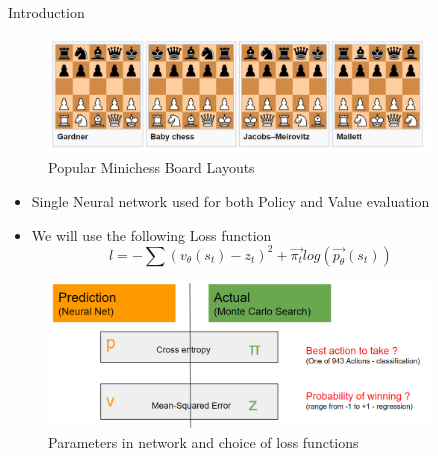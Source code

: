 \documentclass[final]{beamer}
\newlength{\sepwid}
\newlength{\onecolwid}
\newlength{\twocolwid}
\begin{document}
\begin{frame}[t]
\begin{columns}[t]
\begin{column}{\onecolwid}
\begin{block}{Introduction}
\begin{figure}
\includegraphics[width=1.0\linewidth]{minichess.png}
\caption{Popular Minichess Board Layouts}
\end{figure}

\begin{itemize}
\item Single Neural network used for both Policy and Value evaluation
\item We will use the following Loss function \[ l = - \sum (v_{\theta}(s_{t}) - z_{t})^{2}+ \vec{\pi_{t}} log(\vec{p_{\theta}}(s_{t}))  \]
\end{itemize}

\begin{figure}
\includegraphics[width=1.0\linewidth]{loss.png}
\caption{Parameters in network and choice of loss functions}
\end{figure}


\end{block}



\end{column} %

\begin{column}{\sepwid}\end{column} %

\begin{column}{\twocolwid} %


\end{column}
\end{columns}
\end{frame}
\end{document}
